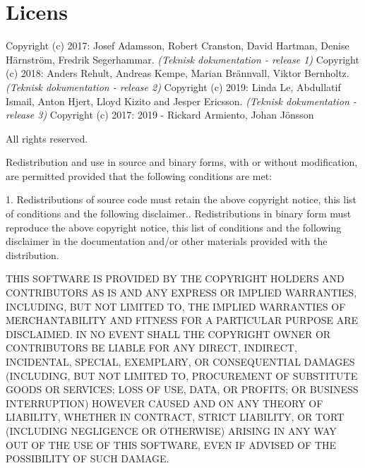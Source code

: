\section{Licens}
\label{ref:licens}
Copyright (c) 2017: Josef Adamsson, Robert Cranston, David Hartman, Denise Härnström, Fredrik Segerhammar. \textit{(Teknisk dokumentation - release 1)}\newline
Copyright (c) 2018: Anders Rehult, Andreas Kempe, Marian Brännvall, Viktor Bernholtz. \textit{(Teknisk dokumentation - release 2)}\newline
Copyright (c) 2019: Linda Le, Abdullatif Ismail, Anton Hjert, Lloyd Kizito and Jesper Ericsson. \textit{(Teknisk dokumentation - release 3)}\newline
Copyright (c) 2017: 2019 - Rickard Armiento, Johan Jönsson

All rights reserved.

Redistribution and use in source and binary forms, with or without
modification, are permitted provided that the following conditions are met:

1. Redistributions of source code must retain the above copyright notice, this list of conditions and the following disclaimer.. Redistributions in binary form must reproduce the above copyright notice, this list of conditions and the following disclaimer in the documentation and/or other materials provided with the distribution.

THIS SOFTWARE IS PROVIDED BY THE COPYRIGHT HOLDERS AND CONTRIBUTORS AS IS AND ANY EXPRESS OR IMPLIED WARRANTIES, INCLUDING,
BUT NOT LIMITED TO, THE IMPLIED WARRANTIES OF MERCHANTABILITY AND FITNESS FOR A PARTICULAR PURPOSE ARE DISCLAIMED. IN NO EVENT
SHALL THE COPYRIGHT OWNER OR CONTRIBUTORS BE LIABLE FOR ANY DIRECT, INDIRECT, INCIDENTAL, SPECIAL, EXEMPLARY, OR CONSEQUENTIAL
DAMAGES (INCLUDING, BUT NOT LIMITED TO, PROCUREMENT OF SUBSTITUTE GOODS OR SERVICES; LOSS OF USE, DATA, OR PROFITS; OR BUSINESS
INTERRUPTION) HOWEVER CAUSED AND ON ANY THEORY OF LIABILITY, WHETHER IN CONTRACT, STRICT LIABILITY, OR TORT (INCLUDING
NEGLIGENCE OR OTHERWISE) ARISING IN ANY WAY OUT OF THE USE OF THIS SOFTWARE, EVEN IF ADVISED OF THE POSSIBILITY OF SUCH DAMAGE.
